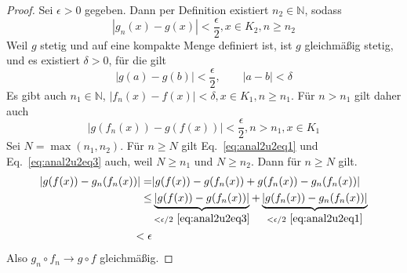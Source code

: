 \documentclass[prb,12pt]{revtex4-2}
\theoremstyle{definition}
\theoremstyle{definition}
\newcommand{\N}{\mathbb{N}}
\begin{document}
\begin{proof}
	Sei $\epsilon>0$ gegeben. Dann per Definition existiert $n_2\in\N$, sodass 
	\begin{equation}\label{eq:anal2u2eq1}
		|g_n(x)-g(x)|<\frac{\epsilon}{2}, x\in K_2, n\ge n_2 
	\end{equation}
	Weil $g$ stetig und auf eine kompakte Menge definiert ist, ist $g$ gleichmäßig stetig, und es existiert $\delta>0$, f\"{u}r die gilt
	\begin{equation}\label{eq:anal2u2eq2}
		|g(a)-g(b)|<\frac{\epsilon}{2}, \qquad |a-b|<\delta
	\end{equation}
	Es gibt auch $n_1\in\N$, $|f_n(x)-f(x)|<\delta, x\in K_1, n\ge n_1$. F\"{u}r $n>n_1$ gilt daher auch
	\begin{equation}\label{eq:anal2u2eq3}
		|g(f_n(x))-g(f(x))|<\frac{\epsilon}{2}, n>n_1, x\in K_1
	\end{equation}
	Sei $N=\max(n_1,n_2)$. F\"{u}r $n\ge N$ gilt Eq.~\eqref{eq:anal2u2eq1} und Eq.~\eqref{eq:anal2u2eq3} auch, weil $N\ge n_1$ und $N\ge n_2$. Dann f\"{u}r $n\ge N$ gilt.
	\begin{align*}
		|g(f(x))-g_n(f_n(x))|		=&|g(f(x))-g(f_n(x))+g(f_n(x))-g_n(f_n(x))|\\
		\le&\underbrace{|g(f(x))-g(f_n(x))|}_{< \epsilon / 2~\eqref{eq:anal2u2eq3}}+\underbrace{|g(f_n(x))-g_n(f_n(x))|}_{< \epsilon / 2~\eqref{eq:anal2u2eq1}}\\
		<\epsilon
	\end{align*}
	Also $g_n\circ f_n\to g\circ f$ gleichmäßig.
\end{proof}
	
\end{document}
